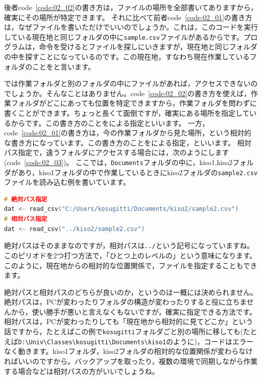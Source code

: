 \documentclass{ltjsbook}
\begin{document}
後者code~\ref{code:02_02}の書き方は，ファイルの場所を全部書いてありますから，確実にその場所が特定できます。
それに比べて前者code~\ref{code:02_01}の書き方は，なぜファイルを書いただけでいいのでしょうか。これは，このコードを実行している現在地と同じフォルダの中に\verb|sample.csv|ファイルがあるからです。プログラムは，命令を受けるとファイルを探しにいきますが，現在地と同じフォルダの中を探すことになっているのです。この現在地，すなわち現在作業しているフォルダのことをと言います。

では作業フォルダと別のフォルダの中にファイルがあれば，アクセスできないのでしょうか。そんなことはありません。code~\ref{code:02_02}の書き方を使えば，作業フォルダがどこにあっても位置を特定できますから，作業フォルダを問わずに書くことができます。ちょっと長くて面倒ですが，確実にある場所を指定しているからです。この書き方のことをによる指定といいます。
一方，code~\ref{code:02_01}の書き方は，今の作業フォルダから見た場所，という相対的な書き方になっています。この書き方のことをによる指定，といいます。
相対パス指定で，違うフォルダにアクセスする場合には，次のようにします(code~\ref{code:02_03})。
ここでは，\verb|Documents|フォルダの中に，kiso1,kiso2フォルダがあり，kiso1フォルダの中で作業しているときにkiso2フォルダの\verb|sample2.csv|ファイルを読み込む例を書いています。

\begin{lstlisting}[language=c++,label={code:02_03},caption={別のフォルダのファイルを読み込む}]
# 絶対パス指定
dat <- read_csv("C:/Users/kosugitti/Documents/kiso2/sample2.csv")
# 相対パス指定
dat <- read_csv("../kiso2/sample2.csv")
\end{lstlisting}

絶対パスはそのままなのですが，相対パスは\verb|../|という記号になっていますね。このピリオドを2つ打つ方法で，「ひとつ上のレベルの」という意味になります。このように，現在地からの相対的な位置関係で，ファイルを指定することもできます。

絶対パスと相対パスのどちらが良いのか，というのは一概には決められません。
絶対パスは，PCが変わったりフォルダの構造が変わったりすると役に立ちませんから，使い勝手が悪いと言えなくもないですが，確実に指定できる方法です。
相対パスは，PCが変わったりしても「現在地から相対的に見てどこか」という話ですから，たとえばこの例で\verb|kosugitti|フォルダごと別の場所に移しても(たとえば\verb|D:\Univ\Classes\kosugitti\Documents\kiso1|のように)，コードはエラーなく動きます。kiso1フォルダ，kiso2フォルダの相対的な位置関係が変わらなければいいのですから。バックアップを取ったり，複数の環境で同期しながら作業する場合などは相対パスの方がいいでしょうね。
\end{document}
